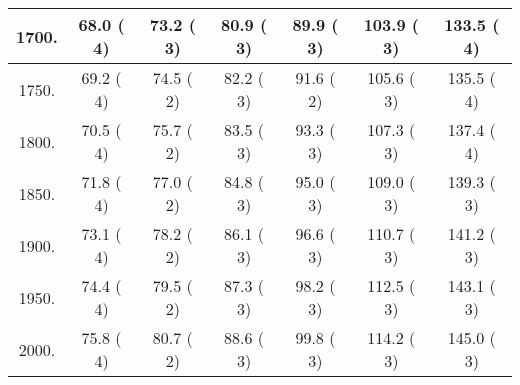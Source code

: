 \begin{tabular}{|c||c|c|c|c|c|c|}
\hline
 1700. &    68.0 (      4) &    73.2 (      3) &    80.9 (      3) &    89.9 (      3) &   103.9 (      3) &   133.5 (      4)\tabularnewline
\hline
 1750. &    69.2 (      4) &    74.5 (      2) &    82.2 (      3) &    91.6 (      2) &   105.6 (      3) &   135.5 (      4)\tabularnewline
\hline
 1800. &    70.5 (      4) &    75.7 (      2) &    83.5 (      3) &    93.3 (      3) &   107.3 (      3) &   137.4 (      4)\tabularnewline
\hline
 1850. &    71.8 (      4) &    77.0 (      2) &    84.8 (      3) &    95.0 (      3) &   109.0 (      3) &   139.3 (      3)\tabularnewline
\hline
 1900. &    73.1 (      4) &    78.2 (      2) &    86.1 (      3) &    96.6 (      3) &   110.7 (      3) &   141.2 (      3)\tabularnewline
\hline
 1950. &    74.4 (      4) &    79.5 (      2) &    87.3 (      3) &    98.2 (      3) &   112.5 (      3) &   143.1 (      3)\tabularnewline
\hline
 2000. &    75.8 (      4) &    80.7 (      2) &    88.6 (      3) &    99.8 (      3) &   114.2 (      3) &   145.0 (      3)\tabularnewline
\hline
\end{tabular}
